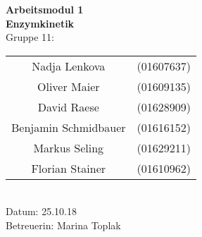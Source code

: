 \begin{titlepage}
  \begin{center}
    \phantom{hallo}
    \vspace{2cm}
    \Huge{\bfseries{Arbeitsmodul 1}}\\
    \vspace{1.5cm}
    \huge{\bfseries{Enzymkinetik}}\\
    \vspace{1.5cm}
    \huge{Gruppe 11}:\\
    \vspace{1cm}
    \begin{tabular}{cc}
      
      Nadja Lenkova & (01607637)\\
      Oliver Maier & (01609135)\\
      David Raese  & (01628909)\\
      Benjamin Schmidbauer & (01616152)\\
      Markus Seling & (01629211)\\
      Florian Stainer & (01610962)\\
    \end{tabular} \\
    \vspace{1cm}
    Datum: 25.10.18\\
    \vspace{3cm}
    Betreuerin: Marina Toplak
  \end{center}
\end{titlepage} 
